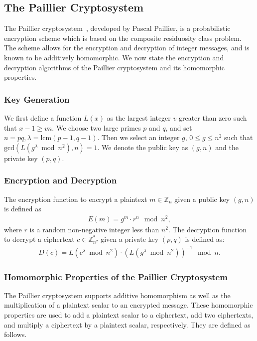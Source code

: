 \subsection{The Paillier Cryptosystem}
The Paillier cryptosystem~\cite{stern_public-key_1999}, developed by Pascal Paillier, is a probabilistic encryption scheme which is based on the composite residuosity class problem. The scheme allows for the encryption and decryption of integer messages, and is known to be additively homomorphic. We now state the encryption and decryption algorithms of the Paillier cryptosystem and its homomorphic properties.

\subsubsection{Key Generation}
We first define a function $L(x)$ as the largest integer $v$ greater than zero such that $x-1 \geq vn$.
We choose two large primes $p$ and $q$, and set $n = pq, \lambda = \mathrm{lcm}(p-1,q-1)$.
Then we select an integer $g$, $0\leq g \leq n^2$ such that $\mathrm{gcd}(L(g^\lambda \bmod n^2), n) = 1$.
We denote the public key as $(g,n)$ and the private key $(p,q)$.
\subsubsection{Encryption and Decryption}
The encryption function to encrypt a plaintext $m \in \mathbb{Z}_n$ given a public key $(g,n)$ is defined as
\begin{align*}
	E(m) = g^m \cdot r^n \mod{n^2},
\end{align*}
where $r$ is a random non-negative integer less than $n^2$.
The decryption function to decrypt a ciphertext $c \in \mathbb{Z}^*_{n^2}$ given a private key $(p,q)$ is defined as:
\begin{align*}
	D(c) = L\left(c^\lambda \bmod n^2\right) \cdot \left(L\left(g^\lambda \bmod n^2\right)\right)^{-1} \mod n.
\end{align*}
\subsubsection{Homomorphic Properties of the Paillier Cryptosystem}
The Paillier cryptosystem supports additive homomorphism as well as the multiplication of a plaintext scalar to an encrypted message. These homomorphic properties are used to add a plaintext scalar to a ciphertext, add two ciphertexts, and multiply a ciphertext by a plaintext scalar, respectively. They are defined as follows.


